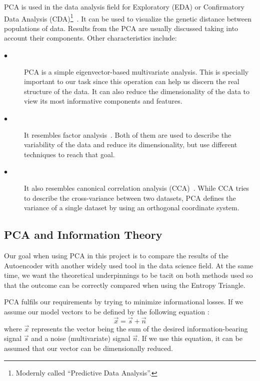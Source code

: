 PCA is used in the data analysis field for Exploratory (EDA) or Confirmatory Data Analysis (CDA)\footnote{Modernly called ``Predictive Data Analysis''.}~\cite{tuk:80}. It can be used to visualize the genetic distance between populations of data. Results from the PCA are usually discussed taking into account their components. Other characteristics include:

\begin{description}
	
	\item[$\bullet$] PCA is a simple eigenvector-based multivariate analysis. This is specially important to our task since this operation can help us discern the real structure of the data. It can also reduce the dimensionality of the data to view its most informative components and features.
	
	\item[$\bullet$] It resembles factor analysis~\cite{citation}. Both of them are used to describe the variability of the data and reduce its dimensionality, but use different techniques to reach that goal.
	
	\item[$\bullet$] It also resembles canonical correlation analysis (CCA)~\cite{citation}. While CCA tries to describe the cross-variance between two datasets, PCA defines the variance of a single dataset by using an orthogonal coordinate system.
	
\end{description}

\subsection{PCA and Information Theory}

Our goal when using PCA in this project is to compare the results of the Autoencoder with another widely used tool in the data science field. At the same time, we want the theoretical underpinnings to be tacit on both methods used so that the outcome can be correctly compared when using the Entropy Triangle.\par

PCA fulfils our requirements by trying to minimize  informational losses. If we assume our model vectors to be defined by the  following equation :
%
\begin{equation}\label{eq:pca_equation}
\vec x = \vec s + \vec n 
\end{equation}
\noindent
where $\vec x$ represents the vector being the sum of the desired information-bearing signal $\vec s$ and a noise (multivariate) signal $\vec n$. If we use this equation, it can be assumed that our vector can be dimensionally reduced.\par

